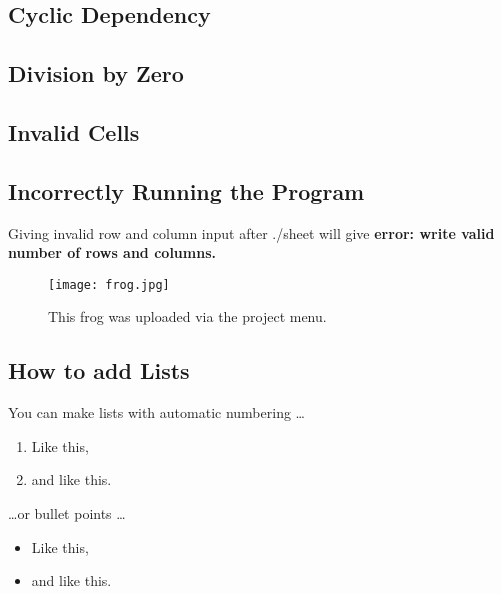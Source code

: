 \documentclass[a4paper]{article}
\begin{document}
\subsection{Cyclic Dependency}



\subsection{Division by Zero}



\subsection{Invalid Cells}


\subsection{Incorrectly Running the Program}

Giving invalid row and column input after ./sheet will give \textbf{error: write valid number of rows and columns.}



\begin{figure}
\centering
\texttt{[image: frog.jpg]}
\caption{\label{fig:frog}This frog was uploaded via the project menu.}
\end{figure}



\subsection{How to add Lists}

You can make lists with automatic numbering \dots

\begin{enumerate}
\item Like this,
\item and like this.
\end{enumerate}
\dots or bullet points \dots
\begin{itemize}
\item Like this,
\item and like this.
\end{itemize}
\end{document}
